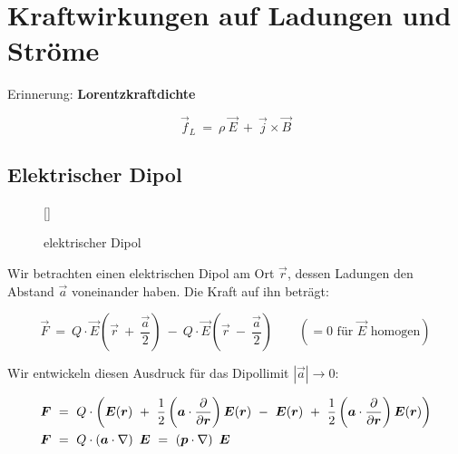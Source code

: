 \chapter[Kraftwirkungen]{Kraftwirkungen auf Ladungen und Ströme}

Erinnerung: \textbf{Lorentzkraftdichte}

\begin{equation*}
\vec{f}_L \ = \ \rho \ \vec{E} \ + \ \vec{j}\times\vec{B}
\end{equation*}

\section{Elektrischer Dipol}
\begin{wrapfigure}[12]{l}[0cm]{0cm}
	\raisebox{0pt}[\dimexpr{}\baselineskip\relax]{
		\colorbox{hgrey}{
		}
	}
	\caption{elektrischer Dipol}
\end{wrapfigure}
Wir betrachten einen elektrischen Dipol am Ort $\vec{r}$, dessen Ladungen den Abstand $\vec{a}$ voneinander haben. Die Kraft auf ihn beträgt:

\begin{equation*}
\vec{F} \ = \ Q \cdot \vec{E}\left(\vec{r} \ + \ \frac{\vec{a}}{2}\right) \ - \ Q \cdot\vec{E} \left(\vec{r} \ - \ \frac{\vec{a}}{2}\right) \qquad (=0 \text{ für $\vec{E}$ homogen})
\end{equation*}

Wir entwickeln diesen Ausdruck für das Dipollimit $|\vec{a}| \rightarrow 0$:

\begin{align*}
\vec{F}  \ &= \ Q \cdot \left( \vec{E} (\vec{r}) \ + \ \frac{1}{2} \left(\vec{a}\cdot\pdiff{}{\vec{r}}\right) \vec{E}(\vec{r}) \ - \ \vec{E}(\vec{r}) \ + \ \frac{1}{2} \left(\vec{a}\cdot\pdiff{}{\vec{r}}\right)\vec{E}(\vec{r})\right) \\
\vec{F} \ &= \ Q\cdot \left(\vec{a}\cdot\nabla\right) \ \vec{E}  \ = \ \left( \vec{p} \cdot \nabla\right) \ \vec{E}
\end{align*}

